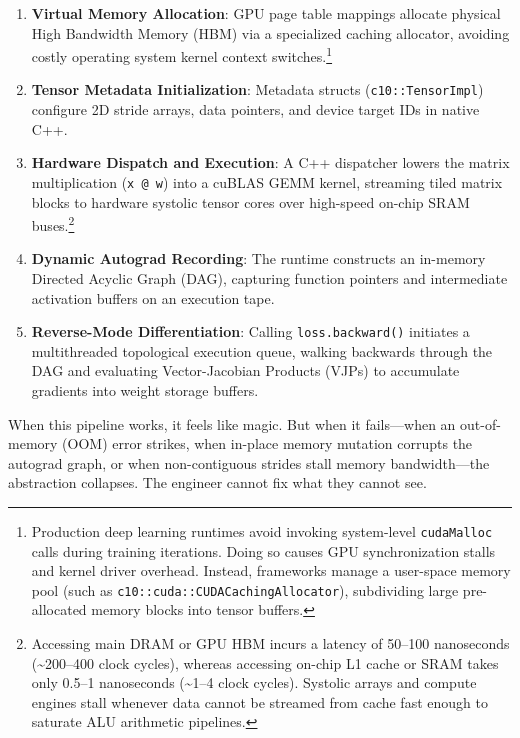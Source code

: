 \documentclass[
  letterpaper,
]{scrbook}
\providecommand{\tightlist}{%
  \setlength{\itemsep}{0pt}\setlength{\parskip}{0pt}}
\begin{document}
\begin{enumerate}
\def\labelenumi{\arabic{enumi}.}
\tightlist
\item
  \textbf{Virtual Memory Allocation}: GPU page table mappings allocate
  physical High Bandwidth Memory (HBM) via a specialized caching
  allocator, avoiding costly operating system kernel context
  switches.\footnote{Production deep learning runtimes avoid invoking
    system-level \texttt{cudaMalloc} calls during training iterations.
    Doing so causes GPU synchronization stalls and kernel driver
    overhead. Instead, frameworks manage a user-space memory pool (such
    as \texttt{c10::cuda::CUDACachingAllocator}), subdividing large
    pre-allocated memory blocks into tensor buffers.}
\item
  \textbf{Tensor Metadata Initialization}: Metadata structs
  (\texttt{c10::TensorImpl}) configure 2D stride arrays, data pointers,
  and device target IDs in native C++.
\item
  \textbf{Hardware Dispatch and Execution}: A C++ dispatcher lowers the
  matrix multiplication (\texttt{x\ @\ w}) into a cuBLAS GEMM kernel,
  streaming tiled matrix blocks to hardware systolic tensor cores over
  high-speed on-chip SRAM buses.\footnote{Accessing main DRAM or GPU HBM
    incurs a latency of 50--100 nanoseconds (\textasciitilde200--400
    clock cycles), whereas accessing on-chip L1 cache or SRAM takes only
    0.5--1 nanoseconds (\textasciitilde1--4 clock cycles). Systolic
    arrays and compute engines stall whenever data cannot be streamed
    from cache fast enough to saturate ALU arithmetic pipelines.}
\item
  \textbf{Dynamic Autograd Recording}: The runtime constructs an
  in-memory Directed Acyclic Graph (DAG), capturing function pointers
  and intermediate activation buffers on an execution tape.
\item
  \textbf{Reverse-Mode Differentiation}: Calling
  \texttt{loss.backward()} initiates a multithreaded topological
  execution queue, walking backwards through the DAG and evaluating
  Vector-Jacobian Products (VJPs) to accumulate gradients into weight
  storage buffers.
\end{enumerate}

When this pipeline works, it feels like magic. But when it fails---when
an out-of-memory (OOM) error strikes, when in-place memory mutation
corrupts the autograd graph, or when non-contiguous strides stall memory
bandwidth---the abstraction collapses. The engineer cannot fix what they
cannot see.
\end{document}
